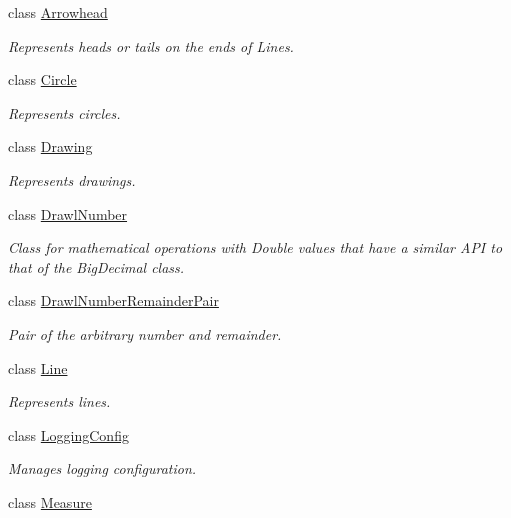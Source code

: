 \begin{DoxyCompactItemize}
\item 
class \hyperlink{classcom_1_1aarrelaakso_1_1drawl_1_1_arrowhead}{Arrowhead}
\begin{DoxyCompactList}\small\item\em Represents heads or tails on the ends of Lines. \end{DoxyCompactList}\item 
class \hyperlink{classcom_1_1aarrelaakso_1_1drawl_1_1_circle}{Circle}
\begin{DoxyCompactList}\small\item\em Represents circles. \end{DoxyCompactList}\item 
class \hyperlink{classcom_1_1aarrelaakso_1_1drawl_1_1_drawing}{Drawing}
\begin{DoxyCompactList}\small\item\em Represents drawings. \end{DoxyCompactList}\item 
class \hyperlink{classcom_1_1aarrelaakso_1_1drawl_1_1_drawl_number}{Drawl\+Number}
\begin{DoxyCompactList}\small\item\em Class for mathematical operations with Double values that have a similar A\+PI to that of the Big\+Decimal class. \end{DoxyCompactList}\item 
class \hyperlink{classcom_1_1aarrelaakso_1_1drawl_1_1_drawl_number_remainder_pair}{Drawl\+Number\+Remainder\+Pair}
\begin{DoxyCompactList}\small\item\em Pair of the arbitrary number and remainder. \end{DoxyCompactList}\item 
class \hyperlink{classcom_1_1aarrelaakso_1_1drawl_1_1_line}{Line}
\begin{DoxyCompactList}\small\item\em Represents lines. \end{DoxyCompactList}\item 
class \hyperlink{classcom_1_1aarrelaakso_1_1drawl_1_1_logging_config}{Logging\+Config}
\begin{DoxyCompactList}\small\item\em Manages logging configuration. \end{DoxyCompactList}\item 
class \hyperlink{classcom_1_1aarrelaakso_1_1drawl_1_1_measure}{Measure}

\end{DoxyCompactItemize}
